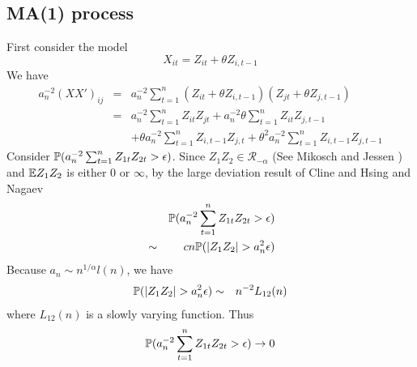 \documentclass{article}
\begin{document}
\subsection{MA(1) process}
First consider the model
\[
X_{it} = Z_{it} + \theta Z_{i,t-1}
\]
We have
\begin{eqnarray*}
  a_n^{-2}(XX')_{ij} &=& a_n^{-2} \sum_{t=1}^n (Z_{it} + \theta
  Z_{i,t-1}) (Z_{jt} + \theta Z_{j,t-1}) \\
  &=& a_n^{-2} \sum_{t=1}^n Z_{it} Z_{jt} + a_n^{-2} \theta \sum_{t=1}^n
  Z_{it} Z_{j,t-1} \\
  && +\theta a_n^{-2} \sum_{t=1}^n Z_{i, t-1}
  Z_{j,t} + \theta^2 a_n^{-2} \sum_{t=1}^n Z_{i,t-1} Z_{j,t-1}
\end{eqnarray*}
Consider $\mathbb{P}(a_n^{-2} \sum_{t=1}^n Z_{1t} Z_{2t} > \epsilon)$. Since
$Z_1 Z_2 \in \mathcal R_{-\alpha}$ (See Mikosch and Jessen
\cite{JessenMikosch2006}) and $\mathbb{E} Z_1 Z_2$ is either 0 or $\infty$, by
the large deviation result of Cline and Hsing \cite{ClingHsing1998}
and Nagaev \cite{nagaev1979}
\begin{eqnarray*}
  && \mathbb{P}(a_n^{-2} \sum_{t=1}^n Z_{1t} Z_{2t} > \epsilon)  \\
  &\sim& c n \mathbb{P}(|Z_1 Z_2| > a_n^{2} \epsilon)  \\
\end{eqnarray*}
Because $a_n \sim n^{1/\alpha} l(n)$, we have
\begin{eqnarray*}
  \mathbb{P}(|Z_1 Z_2| > a_n^{2} \epsilon) &\sim& n^{-2} L_{12}(n)
\end{eqnarray*}
where $L_{12}(n)$ is a slowly varying function. Thus
\[
\mathbb{P}(a_n^{-2} \sum_{t=1}^n Z_{1t} Z_{2t} > \epsilon) \to 0
\]
\end{document}
